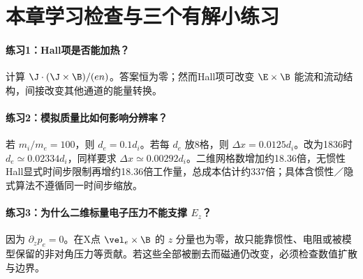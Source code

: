 



\section{本章学习检查与三个有解小练习}
\paragraph{练习1：Hall项是否能加热？}计算 $\J\cdot(\J\times\B)/(en)$。答案恒为零；然而Hall项可改变 $\E\times\B$ 能流和流动结构，间接改变其他通道的能量转换。
\paragraph{练习2：模拟质量比如何影响分辨率？}若 $m_i/m_e=100$，则 $d_e=0.1d_i$。若每 $d_e$ 放8格，则 $\Delta x=0.0125d_i$。改为1836时 $d_e\simeq0.02334d_i$，同样要求 $\Delta x\simeq0.00292d_i$。二维网格数增加约18.36倍，无惯性Hall显式时间步限制再增约18.36倍工作量，总成本估计约337倍；具体含惯性／隐式算法不遵循同一时间步缩放。
\paragraph{练习3：为什么二维标量电子压力不能支撑 $E_z$？}因为 $\partial_zp_e=0$。在X点 $\vel_e\times\B$ 的 $z$ 分量也为零，故只能靠惯性、电阻或被模型保留的非对角压力等贡献。若这些全部被删去而磁通仍改变，必须检查数值扩散与边界。



